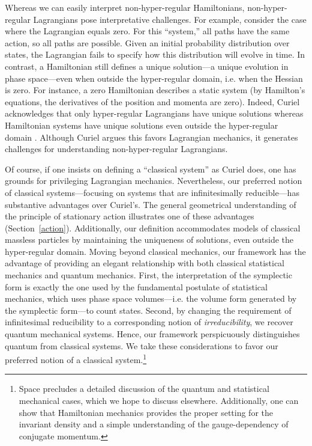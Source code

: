 \documentclass[12pt, twoside]{article}
\begin{document}
Whereas we can easily interpret non-hyper-regular Hamiltonians, non-hyper-regular Lagrangians pose interpretative challenges. For example, consider the case where the Lagrangian equals zero. For this ``system,'' all paths have the same action, so all paths are possible. Given an initial probability distribution over states, the Lagrangian fails to specify how this distribution will evolve in time. In contrast, a Hamiltonian still defines a unique solution---a unique evolution in phase space---even when outside the hyper-regular domain, i.e. when the Hessian is zero. For instance, a zero Hamiltonian describes a static system (by Hamilton's equations, the derivatives of the position and momenta are zero). Indeed, Curiel acknowledges that only hyper-regular Lagrangians have unique solutions whereas Hamiltonian systems have unique solutions even outside the hyper-regular domain \parencites*[291, 308]{Curiel}. Although Curiel argues this favors Lagrangian mechanics, it generates challenges for understanding non-hyper-regular Lagrangians.

Of course, if one insists on defining a ``classical system'' as Curiel does, one has grounds for privileging Lagrangian mechanics. Nevertheless, our preferred notion of classical systems---focusing on systems that are infinitesimally reducible---has substantive advantages over Curiel's. The general geometrical understanding of the principle of stationary action illustrates one of these advantages (Section~\ref{action}). Additionally, our definition accommodates models of classical massless particles by maintaining the uniqueness of solutions, even outside the hyper-regular domain. Moving beyond classical mechanics, our framework has the advantage of providing an elegant relationship with both classical statistical mechanics and quantum mechanics. First, the interpretation of the symplectic form is exactly the one used by the fundamental postulate of statistical mechanics, which uses phase space volumes---i.e. the volume form generated by the symplectic form---to count states. Second, by changing the requirement of infinitesimal reducibility to a corresponding notion of \textit{irreducibility}, we recover quantum mechanical systems. Hence, our framework perspicuously distinguishes quantum from classical systems. We take these considerations to favor our preferred notion of a classical system.\footnote{Space precludes a detailed discussion of the quantum and statistical mechanical cases, which we hope to discuss elsewhere. Additionally, one can show that Hamiltonian mechanics provides the proper setting for the invariant density and a simple understanding of the gauge-dependency of conjugate momentum.}  
\end{document}
